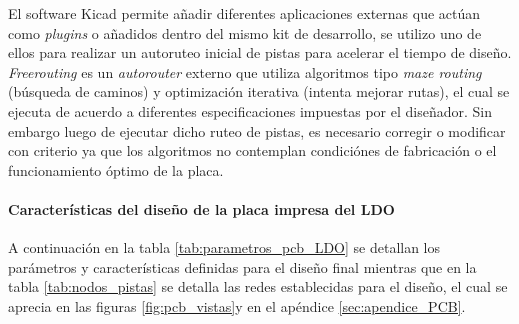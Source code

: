 \documentclass[]{article}
\begin{document}
	El software Kicad permite añadir diferentes aplicaciones externas que actúan como \textit{plugins} o añadidos dentro del mismo kit de desarrollo, se utilizo uno de ellos para realizar un autoruteo inicial de pistas para acelerar el tiempo de diseño. \textit{Freerouting} es un \textit{autorouter} externo que utiliza algoritmos tipo \textit{maze routing} (búsqueda de caminos) y optimización iterativa (intenta mejorar rutas), el cual se ejecuta de acuerdo a diferentes especificaciones impuestas por el diseñador. Sin embargo luego de ejecutar dicho ruteo de pistas, es necesario corregir o modificar con criterio ya que los algoritmos no contemplan condiciónes de fabricación o el funcionamiento óptimo de la placa.
	
	
	\paragraph{Características del diseño de la placa impresa del LDO}
	
	A continuación en la tabla \ref{tab:parametros_pcb_LDO} se detallan los parámetros y características definidas para el diseño final mientras que en la tabla \ref{tab:nodos_pistas} se detalla las redes establecidas para el diseño, el cual se aprecia en las figuras \ref{fig:pcb_vistas}y en el apéndice \ref{sec:apendice_PCB}.
	
\end{document}
